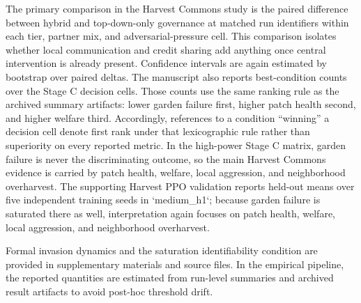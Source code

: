 The primary comparison in the Harvest Commons study is the paired difference between hybrid and top-down-only governance at matched run identifiers within each tier, partner mix, and adversarial-pressure cell. This comparison isolates whether local communication and credit sharing add anything once central intervention is already present. Confidence intervals are again estimated by bootstrap over paired deltas. The manuscript also reports best-condition counts over the Stage C decision cells. Those counts use the same ranking rule as the archived summary artifacts: lower garden failure first, higher patch health second, and higher welfare third. Accordingly, references to a condition ``winning'' a decision cell denote first rank under that lexicographic rule rather than superiority on every reported metric. In the high-power Stage C matrix, garden failure is never the discriminating outcome, so the main Harvest Commons evidence is carried by patch health, welfare, local aggression, and neighborhood overharvest. The supporting Harvest PPO validation reports held-out means over five independent training seeds in `medium\_h1`; because garden failure is saturated there as well, interpretation again focuses on patch health, welfare, local aggression, and neighborhood overharvest.

Formal invasion dynamics and the saturation identifiability condition are provided in supplementary materials and source files. In the empirical pipeline, the reported quantities are estimated from run-level summaries and archived result artifacts to avoid post-hoc threshold drift.
